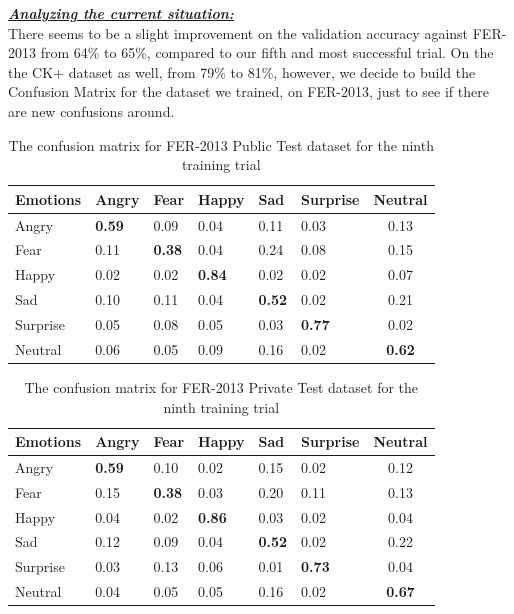 \documentclass[runningheads,a4paper,11pt]{report}
\begin{document}
\clearpage
\underline{\textbf{\emph{Analyzing the current situation:}}}\\
There seems to be a slight improvement on the validation accuracy against FER-2013 from 64\% to 65\%, compared to our fifth and most successful trial. On the the CK+ dataset as well, from 79\% to 81\%, however, we decide to build the Confusion Matrix for the dataset we trained, on FER-2013, just to see if there are new confusions around.

\begin{table}[htbp]
	\caption{The confusion matrix for FER-2013 Public Test dataset for the ninth training trial}
	\label{fer_training_28k_01_mean_square_filtered_public_test_confusion_matrix}
		\begin{center}
			\begin{tabular}{p{40pt}p{40pt}p{40pt}p{40pt}p{40pt}p{40pt}c}
				\textbf{Emotions}& \textbf{Angry}& \textbf{Fear}& \textbf{Happy}& \textbf{Sad}& \textbf{Surprise}& \textbf{Neutral} \\
				\hline\hline
				Angry& \textbf{0.59}& 0.09& 0.04& 0.11& 0.03& 0.13 \\
				Fear& 0.11& \textbf{0.38}& 0.04& 0.24& 0.08& 0.15 \\
				Happy& 0.02& 0.02& \textbf{0.84}& 0.02& 0.02& 0.07 \\
				Sad& 0.10& 0.11& 0.04& \textbf{0.52}& 0.02& 0.21 \\
				Surprise& 0.05& 0.08& 0.05& 0.03& \textbf{0.77}& 0.02 \\
				Neutral& 0.06& 0.05& 0.09& 0.16& 0.02& \textbf{0.62} \\
				\hline
			\end{tabular}
		\end{center}
\end{table}
\begin{table}[htbp]
	\caption{The confusion matrix for FER-2013 Private Test dataset for the ninth training trial}
	\label{fer_training_28k_01_mean_square_filtered_private_test_confusion_matrix}
		\begin{center}
			\begin{tabular}{p{40pt}p{40pt}p{40pt}p{40pt}p{40pt}p{40pt}c}
				\textbf{Emotions}& \textbf{Angry}& \textbf{Fear}& \textbf{Happy}& \textbf{Sad}& \textbf{Surprise}& \textbf{Neutral} \\
				\hline\hline
				Angry& \textbf{0.59}& 0.10& 0.02& 0.15& 0.02& 0.12 \\
				Fear& 0.15& \textbf{0.38}& 0.03& 0.20& 0.11& 0.13 \\
				Happy& 0.04& 0.02& \textbf{0.86}& 0.03& 0.02& 0.04 \\
				Sad& 0.12& 0.09& 0.04& \textbf{0.52}& 0.02& 0.22 \\
				Surprise& 0.03& 0.13& 0.06& 0.01& \textbf{0.73}& 0.04 \\
				Neutral& 0.04& 0.05& 0.05& 0.16& 0.02& \textbf{0.67} \\
				\hline
			\end{tabular}
		\end{center}
\end{table}
\end{document}
